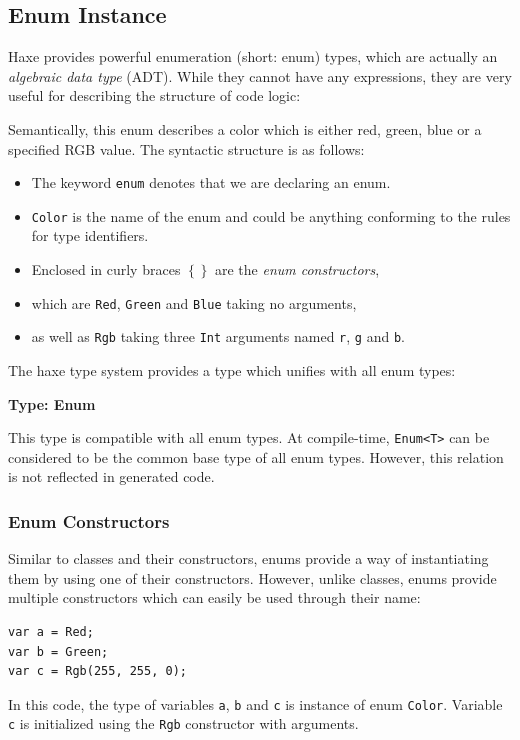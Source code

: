 \documentclass{article}
\newcommand{\type}[1]{\texttt{#1}}
\newcommand{\expr}[1]{\texttt{#1}}
\newenvironment{myshaded}
  {\def\FrameCommand{\fboxsep=\topsep\colorbox{bgcolor}}%
  \MakeFramed {\advance\hsize-\width \FrameRestore}}%
 {\endMakeFramed}
\newcommand{\define}[3][Definition]
	{\begin{myshaded}\noindent\textbf{#1: #2}\par\nobreak\noindent\ignorespaces#3\label{def:#2}\end{myshaded}}
\begin{document}
\subsection{Enum Instance}
\label{Enum Instance}

Haxe provides powerful enumeration (short: enum) types, which are actually an \emph{algebraic data type} (ADT). While they cannot have any expressions, they are very useful for describing the structure of code logic:


Semantically, this enum describes a color which is either red, green, blue or a specified RGB value. The syntactic structure is as follows:
\begin{itemize}
	\item The keyword \expr{enum} denotes that we are declaring an enum.
	\item \type{Color} is the name of the enum and could be anything conforming to the rules for type identifiers.
	\item Enclosed in curly braces \expr{$\left\{\right\}$} are the \emph{enum constructors},
	\item which are \expr{Red}, \expr{Green} and \expr{Blue} taking no arguments,
	\item as well as \expr{Rgb} taking three \type{Int} arguments named \expr{r}, \expr{g} and \expr{b}.
\end{itemize}
The haxe type system provides a type which unifies with all enum types:

\define[Type]{Enum}{This type is compatible with all enum types. At compile-time, \type{Enum<T>} can be considered to be the common base type of all enum types. However, this relation is not reflected in generated code.} 

\subsubsection{Enum Constructors}
\label{Enum Constructors}

Similar to classes and their constructors, enums provide a way of instantiating them by using one of their constructors. However, unlike classes, enums provide multiple constructors which can easily be used through their name:

\begin{lstlisting}
var a = Red;
var b = Green;
var c = Rgb(255, 255, 0);
\end{lstlisting}
In this code, the type of variables \expr{a}, \expr{b} and \expr{c} is instance of enum \type{Color}. Variable \expr{c} is initialized using the \expr{Rgb} constructor with arguments.
\end{document}
